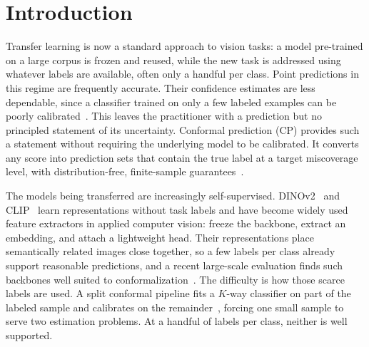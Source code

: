 %

\section{Introduction}
\label{sec:intro}
Transfer learning is now a standard approach to vision tasks: a model pre-trained on a large corpus is frozen and reused, while the new task is addressed using whatever labels are available, often only a handful per class. Point predictions in this regime are frequently accurate. Their confidence estimates are less dependable, since a classifier trained on only a few labeled examples can be poorly calibrated~\citep{guo2017calibration}. This leaves the practitioner with a prediction but no principled statement of its uncertainty. Conformal prediction (CP) provides such a statement without requiring the underlying model to be calibrated. It converts any score into prediction sets that contain the true label at a target miscoverage level, with distribution-free, finite-sample guarantees~\citep{vovk2005algorithmic, angelopoulos2023gentle}.

The models being transferred are increasingly self-supervised. DINOv2~\citep{oquab2023dinov2} and CLIP~\citep{radford2021clip} learn representations without task labels and have become widely used feature extractors in applied computer vision: freeze the backbone, extract an embedding, and attach a lightweight head. Their representations place semantically related images close together, so a few labels per class already support reasonable predictions, and a recent large-scale evaluation finds such backbones well suited to conformalization~\citep{fillioux2026conformal}. The difficulty is how those scarce labels are used. A split conformal pipeline fits a $K$-way classifier on part of the labeled sample and calibrates on the remainder~\citep{papadopoulos2002inductive}, forcing one small sample to serve two estimation problems. At a handful of labels per class, neither is well supported.

